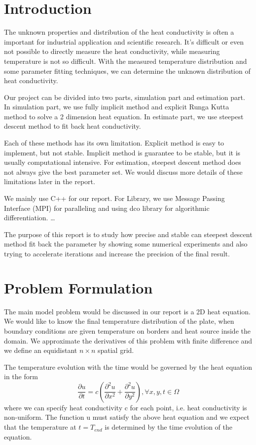\documentclass[10pt,a4paper]{report}
\begin{document}
\chapter{Introduction}

The unknown properties and distribution of the heat conductivity is often a important for industrial application and scientific research. It's difficult or even not possible to directly measure the heat conductivity, while measuring temperature is not so difficult. With the measured temperature distribution and some parameter fitting techniques, we can determine the unknown distribution of heat conductivity.

Our project can be divided into two parts, simulation part and estimation part. In simulation part, we use fully implicit method and explicit Runga Kutta method to solve a 2 dimension heat equation. In estimate part, we use steepest descent method to fit back heat conductivity.
 
Each of these methods has its own limitation. Explicit method is easy to implement, but not stable. Implicit method is guarantee to be stable, but it is usually computational intensive. For estimation, steepest descent method does not always give the best parameter set. We would discuss more details of these limitations later in the report. 
 
We mainly use C++ for our report. For Library, we use Message Passing Interface (MPI) for paralleling  and using dco library for algorithmic differentiation. …

The purpose of this report is to study how precise and stable can steepest descent method fit back the parameter by showing some numerical experiments and also trying to accelerate iterations and increase the precision of the final result.  

\chapter{Problem Formulation}

The main model problem would be discussed in our report is a 2D heat equation. We would like to know the final temperature distribution of the plate, when boundary conditions are given temperature on borders and heat source inside the domain. We approximate the derivatives of this problem with finite difference and we define an equidistant $n \times  n$ spatial grid. 

The temperature evolution with the time would be governed by the heat equation in the form \[{\frac{\partial u}{\partial t}}=c({\frac{\partial^2 u}{\partial x^2}}+{\frac{\partial^2 u}{\partial y^2}}),\forall{x,y,t}\in \Omega\]
where we can specify heat conductivity c for each point, i.e. heat conductivity is non-uniform. The function u must satisfy the above heat equation and we expect that the temperature at $t=T_{end}$ is determined by the time evolution of the equation.
\end{document}
